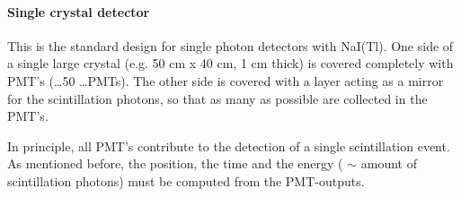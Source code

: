 \documentclass[11pt,oneside]{article}
\begin{document}
\paragraph{Single crystal detector} \label{sec:single_crystal}
This is the standard design for single photon detectors with NaI(Tl). One
side of a single large crystal (e.g. 50 cm x 40 cm, 1 cm thick) is covered
completely with PMT's (\ldots 50 \ldots PMTs). The other side is covered with
a layer acting as a mirror for the scintillation photons, so that as many as
possible are collected in the PMT's.

In principle, all PMT's contribute to the detection of a single
scintillation event. As mentioned before, the position, the time and the
energy ( $\sim$ amount of scintillation photons) must be computed from the
PMT-outputs.
%
\end{document}
